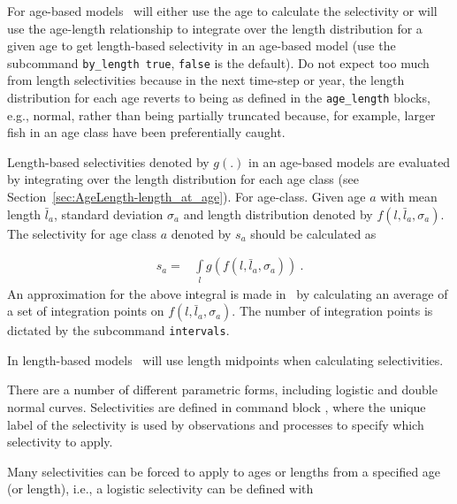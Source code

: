 \ifAgeBased
For age-based models \CNAME\ will either use the age to calculate the selectivity or will use the age-length relationship to integrate over the length distribution for a given age to get length-based selectivity in an age-based model (use the subcommand \texttt{by\_length true}, \texttt{false} is the default). Do not expect too much from length selectivities because in the next time-step or year, the length distribution for each age reverts to being as defined in the \texttt{age\_length} blocks, e.g., normal, rather than being partially truncated because, for example, larger fish in an age class have been preferentially caught.

Length-based selectivities denoted by \(g(.)\) in an age-based models are evaluated by integrating over the length distribution for each age class (see Section~\ref{sec:AgeLength-length_at_age}). For age-class. Given age \(a\) with mean length \(\bar{l}_a\), standard deviation \(\sigma_a\) and length distribution denoted by \(f(l,\bar{l}_a, \sigma_a)\). The selectivity for age class \(a\) denoted by \(s_a\) should be calculated as

\begin{align*}
	s_a = & \int\limits_l g(f(l,\bar{l}_a, \sigma_a)) \ .
\end{align*}
%
An approximation for the above integral is made in \CNAME\ by calculating an average of a set of integration points on \(f(l,\bar{l}_a, \sigma_a)\). The number of integration points is dictated by the subcommand \texttt{intervals}.

\else
In length-based models \CNAME\ will use length midpoints when calculating selectivities. 
\fi %

There are a number of different parametric forms, including logistic and double normal curves. Selectivities are defined in command block , where the unique label of the selectivity is used by observations and processes to specify which selectivity to apply.

Many selectivities can be forced to apply to ages or lengths from a specified age (or length), i.e., a logistic selectivity 
 can be defined with

